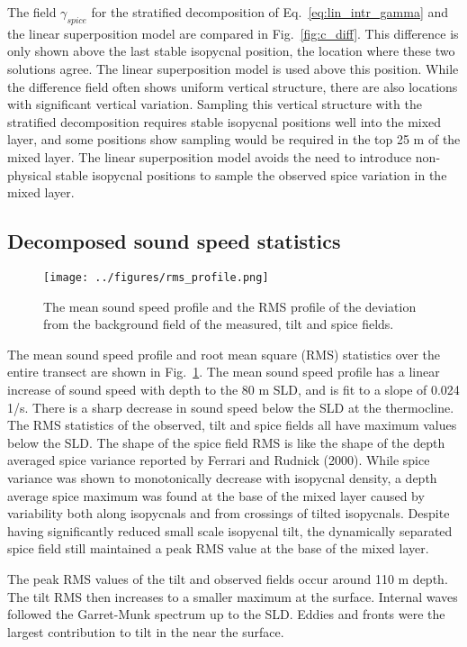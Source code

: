 \documentclass[preprint,NumberedRefs]{JASA}
\begin{document}
The field $\gamma_{spice}$ for the stratified decomposition of Eq.~\eqref{eq:lin_intr_gamma} and the linear superposition model are compared in Fig.~\ref{fig:c_diff}. This difference is only shown above the last stable isopycnal position, the location where these two solutions agree. The linear superposition model is used above this position. While the difference field often shows uniform vertical structure, there are also locations with significant vertical variation. Sampling this vertical structure with the stratified decomposition requires stable isopycnal positions well into the mixed layer, and some positions show sampling would be required in the top 25 m of the mixed layer. The linear superposition model avoids the need to introduce non-physical stable isopycnal positions to sample the observed spice variation in the mixed layer.

\subsection{Decomposed sound speed statistics}
\begin{figure}
\texttt{[image: ../figures/rms\_profile.png]}
    \caption{\label{fig:c_rms}{The mean sound speed profile and the RMS profile of the deviation from the background field of the measured, tilt and spice fields.}}
\end{figure}

The mean sound speed profile and root mean square (RMS) statistics over the entire transect are shown in Fig.~\ref{fig:c_rms}. The mean sound speed profile has a linear increase of sound speed with depth to the 80 m SLD, and is fit to a slope of 0.024 1/s. There is a sharp decrease in sound speed below the SLD at the thermocline. The RMS statistics of the observed, tilt and spice fields all have maximum values below the SLD. The shape of the spice field RMS is like the shape of the depth averaged spice variance reported by Ferrari and Rudnick (2000)\citep{ferrari2000}. While spice variance was shown to monotonically decrease with isopycnal density, a depth average spice maximum was found at the base of the mixed layer caused by variability both along isopycnals and from crossings of tilted isopycnals. Despite having significantly reduced small scale isopycnal tilt, the dynamically separated spice field still maintained a peak RMS value at the base of the mixed layer.

The peak RMS values of the tilt and observed fields occur around 110 m depth. The tilt RMS then increases to a smaller maximum at the surface. Internal waves followed the Garret-Munk spectrum up to the SLD. Eddies and fronts were the largest contribution to tilt in the near the surface.
\end{document}

